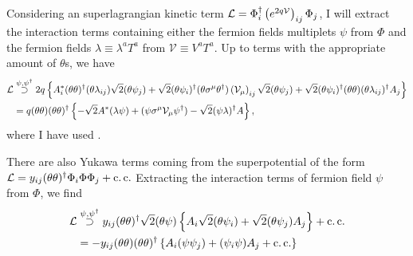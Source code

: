 \documentclass[../main.tex]{subfiles}
\begin{document}
\begin{donotread}
  Considering an superlagrangian kinetic term \(\mathcal{L} = \Phi^\dagger_i
  \left(e^{2q \mathcal{V}}\right)_{ij} \Phi_j\), I will extract the interaction
  terms containing either the fermion fields multiplets \(\psi\) from \(\Phi\)
  and the fermion fields \(\lambda \equiv \lambda^a T^a\) from \(\mathcal{V}
  \equiv V^a T^a\). Up to terms with the appropriate amount of \(\theta\)s, we
  have
  \begin{align}
    \label{susy:eq:psi_kin_int}
    \nonumber
    \mathcal{L} & \stackrel{\psi, \psi^\dagger}{\supset} 2q \left\{ A^\ast_i (\theta\theta)^\dagger (\theta\lambda_{ij}) \sqrt{2} (\theta\psi_j) + \sqrt{2} (\theta\psi_i)^\dagger (\theta\sigma^\mu\theta^\dagger) \left(\mathcal{V}_\mu\right)_{ij} \sqrt{2} (\theta\psi_j) + \sqrt{2} (\theta\psi_i)^\dagger (\theta\theta) (\theta\lambda_{ij})^\dagger A_j \right\} \\
       & = q(\theta\theta)(\theta\theta)^\dagger \left\{ -\sqrt{2} A^\ast (\lambda\psi) + (\psi \sigma^\mu \mathcal{V}_\mu \psi^\dagger) - \sqrt{2} (\psi\lambda)^\dagger A \right\},
  \end{align}
  where I have used . 
  \medskip

  There are also Yukawa terms coming from the superpotential of the form \(\mathcal{L} =
  y_{ij} (\theta\theta)^\dagger \Phi_i \Phi \Phi_j + \operatorname{c.c.}\) Extracting the
  interaction terms of fermion field \(\psi\) from \(\Phi\), we find
  \begin{align}
    \label{susy:eq:psi_yuk_int}
    \nonumber
    \mathcal{L} & \stackrel{\psi, \psi^\dagger}{\supset} y_{ij} (\theta\theta)^\dagger \sqrt{2} (\theta\psi) \left\{ A_i \sqrt{2}(\theta\psi_i) + \sqrt{2}(\theta\psi_j)A_j \right\} + \operatorname{c.c.} \\
       & = -y_{ij} (\theta\theta)(\theta\theta)^\dagger \left\{ A_i(\psi\psi_j) + (\psi_i\psi)A_j + \operatorname{c.c.} \right\}
  \end{align}


\end{donotread}
\end{document}
